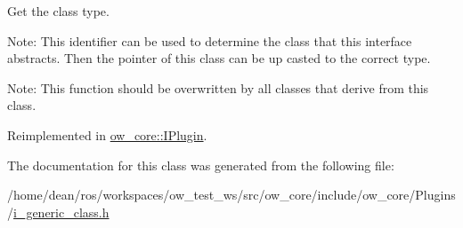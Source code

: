 Get the class type. 

Note\+: This identifier can be used to determine the class that this interface abstracts. Then the pointer of this class can be up casted to the correct type.

Note\+: This function should be overwritten by all classes that derive from this class. 

Reimplemented in \hyperlink{classow__core_1_1IPlugin_aff710e9ec9633592c7f013b9c85a4722}{ow\+\_\+core\+::\+I\+Plugin}.



The documentation for this class was generated from the following file\+:\begin{DoxyCompactItemize}
\item 
/home/dean/ros/workspaces/ow\+\_\+test\+\_\+ws/src/ow\+\_\+core/include/ow\+\_\+core/\+Plugins/\hyperlink{i__generic__class_8h}{i\+\_\+generic\+\_\+class.\+h}\end{DoxyCompactItemize}
